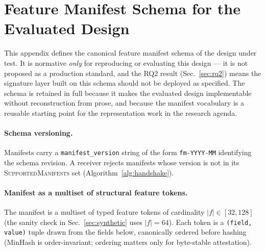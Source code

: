 \documentclass[11pt]{article}
\begin{document}
\appendix
\section{Feature Manifest Schema for the Evaluated Design}
\label{app:manifest}

This appendix defines the canonical feature manifest schema of the design under test. It is normative \emph{only} for reproducing or evaluating this design --- it is not proposed as a production standard, and the RQ2 result (Sec.~\ref{sec:rq2}) means the signature layer built on this schema should not be deployed as specified. The schema is retained in full because it makes the evaluated design implementable without reconstruction from prose, and because the manifest vocabulary is a reusable starting point for the representation work in the research agenda.

\paragraph{Schema versioning.} Manifests carry a \texttt{manifest\_version} string of the form \texttt{fm-YYYY-MM} identifying the schema revision. A receiver rejects manifests whose version is not in its \textsc{SupportedManifests} set (Algorithm~\ref{alg:handshake}).

\paragraph{Manifest as a multiset of structural feature tokens.} The manifest is a multiset of typed feature tokens of cardinality $|f| \in [32, 128]$ (the sanity check in Sec.~\ref{sec:synthetic} uses $|f| = 64$). Each token is a \texttt{(field, value)} tuple drawn from the fields below, canonically ordered before hashing (MinHash is order-invariant; ordering matters only for byte-stable attestation).
\end{document}
